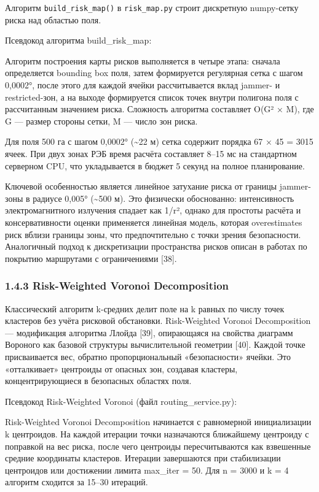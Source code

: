 \documentclass[14pt,a4paper]{extarticle}
\begin{document}
Алгоритм \texttt{build\_risk\_map()} в \texttt{risk\_map.py} строит дискретную numpy-сетку риска над областью поля.

Псевдокод алгоритма build\_risk\_map:

Алгоритм построения карты рисков выполняется в четыре этапа: сначала определяется bounding box поля, затем формируется регулярная сетка с шагом 0,0002°, после этого для каждой ячейки рассчитывается вклад jammer- и restricted-зон, а на выходе формируется список точек внутри полигона поля с рассчитанным значением риска. Сложность алгоритма составляет O(G² × M), где G — размер стороны сетки, M — число зон риска.


Для поля 500 га с шагом 0,0002° (\textasciitilde22 м) сетка содержит порядка 67 × 45 = 3015 ячеек. При двух зонах РЭБ время расчёта составляет 8--15 мс на стандартном серверном CPU, что укладывается в бюджет 5 секунд на полное планирование.

Ключевой особенностью является линейное затухание риска от границы jammer-зоны в радиусе 0,005° (\textasciitilde500 м). Это физически обоснованно: интенсивность электромагнитного излучения спадает как 1/r², однако для простоты расчёта и консервативности оценки применяется линейная модель, которая overestimates риск вблизи границы зоны, что предпочтительно с точки зрения безопасности. Аналогичный подход к дискретизации пространства рисков описан в работах по покрытию маршрутами с ограничениями {[}38{]}.

\hypertarget{risk-weighted-voronoi-decomposition}{%
\subsubsection{1.4.3 Risk-Weighted Voronoi Decomposition}\label{risk-weighted-voronoi-decomposition}}

Классический алгоритм k-средних делит поле на k равных по числу точек кластеров без учёта рисковой обстановки. Risk-Weighted Voronoi Decomposition --- модификация алгоритма Ллойда {[}39{]}, опирающаяся на свойства диаграмм Вороного как базовой структуры вычислительной геометрии {[}40{]}. Каждой точке присваивается вес, обратно пропорциональный «безопасности» ячейки. Это «отталкивает» центроиды от опасных зон, создавая кластеры, концентрирующиеся в безопасных областях поля.

Псевдокод Risk-Weighted Voronoi (файл routing\_service.py):

Risk-Weighted Voronoi Decomposition начинается с равномерной инициализации k центроидов. На каждой итерации точки назначаются ближайшему центроиду с поправкой на вес риска, после чего центроиды пересчитываются как взвешенные средние координаты кластеров. Итерации завершаются при стабилизации центроидов или достижении лимита max_iter = 50. Для n = 3000 и k = 4 алгоритм сходится за 15–30 итераций.
\end{document}
